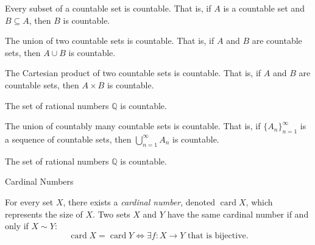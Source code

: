 \documentclass[12pt, a4paper]{article}
\DeclareMathOperator{\card}{card}
\newcommand{\Q}{\mathbb{Q}}
\begin{document}
\begin{theorem}
	Every subset of a countable set is countable. That is, if \(A\) is a countable set and \(B \subseteq A\), then \(B\) is countable.
\end{theorem}

\clearpage

\begin{theorem}
	The union of two countable sets is countable. That is, if \(A\) and \(B\) are countable sets, then \(A \cup B\) is countable.
\end{theorem}

\clearpage

\begin{theorem}
	The Cartesian product of two countable sets is countable. That is, if \(A\) and \(B\) are countable sets, then \(A \times B\) is countable.
\end{theorem}

\clearpage

\begin{problem}
	The set of rational numbers \(\Q\) is countable.
\end{problem}

\clearpage

\begin{theorem}
	The union of countably many countable sets is countable. That is, if \(\{A_n\}_{n=1}^{\infty}\) is a sequence of countable sets, then \(\bigcup_{n=1}^{\infty} A_n\) is countable.
\end{theorem}

\clearpage

\begin{problem}
	The set of rational numbers \(\Q\) is countable.
\end{problem}

\clearpage

\begin{heading}
	Cardinal Numbers
\end{heading}

\vspace{10pt}

\begin{definition}
	For every set \( X \), there exists a \emph{cardinal number}, denoted \( \card X \), which represents the size of \( X \).  
	Two sets \( X \) and \( Y \) have the same cardinal number if and only if \( X \sim Y \):
	\[
	\card X = \card Y \iff \exists f : X \to Y \text{ that is bijective.}
	\]
\end{definition}
\end{document}
